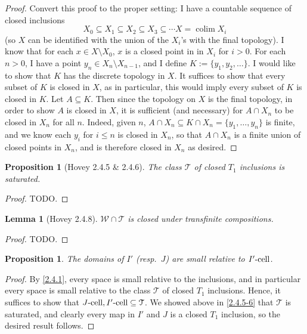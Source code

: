 \documentclass{amsart}
\theoremstyle{plain}
\newtheorem{proposition}[theorem]{Proposition}
\newtheorem{lemma}[theorem]{Lemma}
\theoremstyle{definition}
\newcommand{\sseq}{\subseteq}
\newcommand{\0}{\mathbf{0}}
\newcommand{\cT}{\mathcal T}
\newcommand{\cW}{\mathcal W}
\renewcommand{\(}{\left(}
\renewcommand{\)}{\right)}
\newcommand{\cell}{\text-\mathrm{cell}}
\DeclareMathOperator*{\colim}{colim}
\begin{document}
\begin{proof}
  \color{red} Convert this proof to the proper setting: I have a countable sequence of closed inclusions 
  \[X_0\sseq X_1\sseq X_2\sseq X_3\sseq\cdots X=\colim X_i\]
  (so $X$ can be identified with the union of the $X_i$'s with the final topology). I know that for each $x\in X\setminus X_0$, $x$ is a closed point in in $X_i$ for $i>0$. For each $n>0$, I have a point $y_n\in X_n\setminus X_{n-1}$, and I define $K:=\{y_1,y_2,\ldots\}$. I would like to show that $K$ has the discrete topology in $X$. It suffices to show that every subset of $K$ is closed in $X$, as in particular, this would imply every subset of $K$ is closed in $K$. Let $A\sseq K$. Then since the topology on $X$ is the final topology, in order to show $A$ is closed in $X$, it is sufficient (and necessary) for $A\cap X_n$ to be closed in $X_n$ for all $n$. Indeed, given $n$, $A\cap X_n\sseq K\cap X_n=\{y_1,\ldots,y_n\}$ is finite, and we know each $y_i$ for $i\leq n$ is closed in $X_n$, so that $A\cap X_n$ is a finite union of closed points in $X_n$, and is therefore closed in $X_n$ as desired.
\end{proof}

\begin{proposition}[Hovey 2.4.5 \& 2.4.6]\label{2.4.5-6}
  The class $\cT$ of closed $T_1$ inclusions is saturated.
\end{proposition}
\begin{proof}
  \color{red}TODO.
\end{proof}

\begin{lemma}[Hovey 2.4.8]\label{2.4.8}
  $\cW\cap\cT$ is closed under transfinite compositions.
\end{lemma}
\begin{proof}
  \color{red}TODO.
\end{proof}

\begin{proposition}\label{domains_of_I'/J_small_rel_I'-cell/J-cell}
  The domains of $I'$ (resp.\ $J$) are small relative to $I'\cell$.
\end{proposition}
\begin{proof}
  By \autoref{2.4.1}, every space is small relative to the inclusions, and in particular every space is small relative to the class $\cT$ of closed $T_1$ inclusions. Hence, it suffices to show that $J\cell,I'\cell\sseq\cT$. We showed above in \autoref{2.4.5-6} that $\cT$ is saturated, and clearly every map in $I'$ and $J$ is a closed $T_1$ inclusion, so the desired result follows.
\end{proof}
\end{document}
